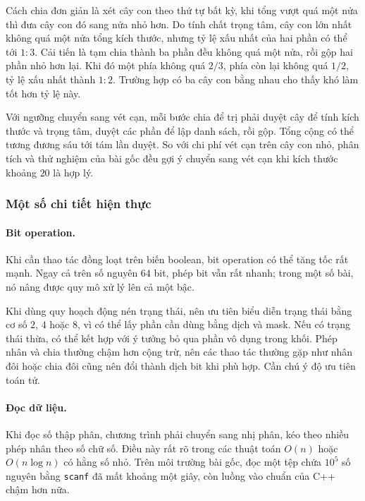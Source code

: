 \documentclass[11pt]{article}
\begin{document}
Cách chia đơn giản là xét cây con theo thứ tự bất kỳ, khi tổng vượt quá một
nửa thì đưa cây con đó sang nửa nhỏ hơn. Do tính chất trọng tâm, cây con lớn
nhất không quá một nửa tổng kích thước, nhưng tỷ lệ xấu nhất của hai phần có
thể tới \(1:3\). Cải tiến là tạm chia thành ba phần đều không quá một nửa, rồi
gộp hai phần nhỏ hơn lại. Khi đó một phía không quá \(2/3\), phía còn lại không
quá \(1/2\), tỷ lệ xấu nhất thành \(1:2\). Trường hợp có ba cây con bằng nhau
cho thấy khó làm tốt hơn tỷ lệ này.

Với ngưỡng chuyển sang vét cạn, mỗi bước chia để trị phải duyệt cây để tính
kích thước và trọng tâm, duyệt các phần để lập danh sách, rồi gộp. Tổng cộng
có thể tương đương sáu tới tám lần duyệt. So với chi phí vét cạn trên cây con
nhỏ, phân tích và thử nghiệm của bài gốc đều gợi ý chuyển sang vét cạn khi kích
thước khoảng \(20\) là hợp lý.

\subsubsection{Một số chi tiết hiện thực}

\paragraph{Bit operation.}
Khi cần thao tác đồng loạt trên biến boolean, bit operation có thể tăng tốc rất
mạnh. Ngay cả trên số nguyên \(64\) bit, phép bit vẫn rất nhanh; trong một số
bài, nó nâng được quy mô xử lý lên cả một bậc.

Khi dùng quy hoạch động nén trạng thái, nên ưu tiên biểu diễn trạng thái bằng
cơ số \(2\), \(4\) hoặc \(8\), vì có thể lấy phần cần dùng bằng dịch và mask.
Nếu có trạng thái thừa, có thể kết hợp với ý tưởng bỏ qua phần vô dụng trong
khối. Phép nhân và chia thường chậm hơn cộng trừ, nên các thao tác thường gặp
như nhân đôi hoặc chia đôi cũng nên đổi thành dịch bit khi phù hợp. Cần chú ý
độ ưu tiên toán tử.

\paragraph{Đọc dữ liệu.}
Khi đọc số thập phân, chương trình phải chuyển sang nhị phân, kéo theo nhiều
phép nhân theo số chữ số. Điều này rất rõ trong các thuật toán \(O(n)\) hoặc
\(O(n\log n)\) có hằng số nhỏ. Trên môi trường bài gốc, đọc một tệp chứa
\(10^5\) số nguyên bằng \texttt{scanf} đã mất khoảng một giây, còn luồng vào
chuẩn của C++ chậm hơn nữa.
\end{document}

